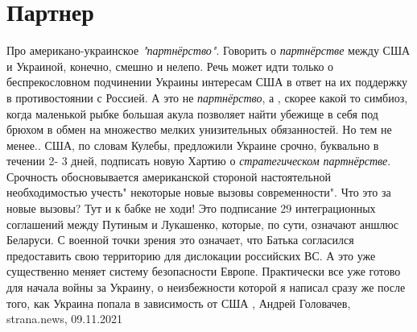  
 
 
 
 
\chapter{Партнер}

Про американо-украинское \emph{"партнёрство"}.
Говорить о \emph{партнёрстве} между США и Украиной, конечно, смешно и нелепо.
Речь может идти только о беспрекословном подчинении Украины интересам США в
ответ на их поддержку в противостоянии с Россией. А это не \emph{партнёрство},
а , скорее какой то симбиоз, когда маленькой рыбке большая акула позволяет
найти убежище в себя под брюхом в обмен на множество мелких унизительных
обязанностей. Но тем не менее..  США, по словам Кулебы, предложили Украине
срочно, буквально в течении 2- 3 дней, подписать новую Хартию о
\emph{стратегическом партнёрстве}. Срочность обосновывается американской
стороной настоятельной необходимостью учесть" некоторые новые вызовы
современности".  Что это за новые вызовы? Тут и к бабке не ходи! Это подписание
29 интеграционных соглашений между Путиным и Лукашенко, которые, по сути,
означают аншлюс Беларуси. С военной точки зрения это означает, что Батька
согласился предоставить свою территорию для дислокации российских ВС. А это уже
существенно меняет систему безопасности Европе. Практически все уже готово для
начала войны за Украину, о неизбежности которой я написал сразу же после того,
как Украина попала в зависимость от США
, 
Андрей Головачев, strana.news, 09.11.2021
